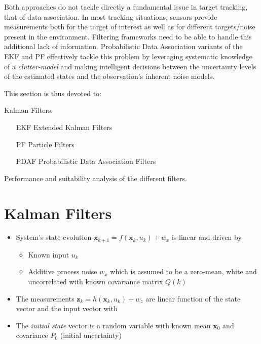 Both approaches do not tackle directly a fundamental issue in target tracking, that of data-association. In most tracking situations, sensors provide measurements both for the target of interest as well as for different targets/noise present in the environment. Filtering frameworks need to be able to handle this additional lack of information. Probabilistic Data Association  \cite{Ristic2004} variants of the EKF and PF effectively tackle this problem by leveraging systematic knowledge of a \emph{clutter-model} and making intelligent decisions between the uncertainty levels of the estimated states and the observation's inherent noise models.

This section is thus devoted to:

\begin{description}[style=nextline]
	\item[Linear filters] Kalman Filters.
	\item [Non-linear filters]
	\begin{itemize}
		\item[]
		\item[EKF] Extended Kalman Filters
		\item[PF]Particle Filters
		\item[PDAF] Probabilistic Data Association Filters 
	\end{itemize}
	\item[Comparison]Performance and suitability analysis of the different filters. 
\end{description}


\section{Kalman Filters}

\begin{itemize}
	\item System's state evolution $\mathbf{x}_{k+1} = f(\mathbf{x}_k,u_k) + w_{\textit{x}}$ is linear and driven by
	\begin{itemize}
		\item Known input $u_k$
		\item Additive process noise $w_{\textit{x}}$ which is assumed to be a zero-mean, white and uncorrelated with known covariance matrix $Q(k)$
	\end{itemize}
	\item The measurements $ \mathbf{z}_k = h(\mathbf{x}_k,u_k) + w_z $  are linear function of the state vector and the input vector with
	\item The \emph{initial state} vector is a random variable with known mean $\mathbf{x}_0$ and covariance $P_0$ (initial uncertainty)
\end{itemize}


